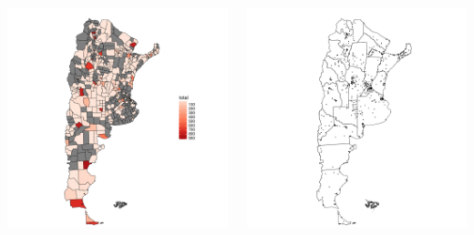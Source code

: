 \begin{frame}[t]
\begin{columns}
    \begin{column}{0.33\textwidth}
        \includegraphics[width=\linewidth]{../src/images/mapadepartamentos.pdf}
        \caption{} 
        \label{fig:mapaDepartamentos}
    \end{column}

    \begin{column}{0.33\textwidth}
        \includegraphics[width=\linewidth]{../src/images/mapaprovinciasConPuntos.pdf}
    \caption{} 
    \label{fig:mapaPuntos}
    \end{column}


\end{columns}
\end{frame}
